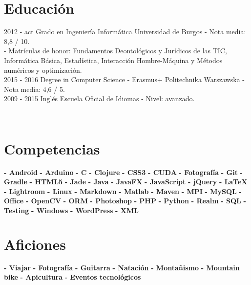 \documentclass[]{friggeri-cv}
\begin{document}
\section{Educación}
\begin{entrylist}
  \entry
    {2012 - act}
    {Grado en Ingeniería Informática}
    {Universidad de Burgos}
    {- Nota media: 8,8 / 10.\\
    - Matrículas de honor: Fundamentos Deontológicos y Jurídicos de las TIC, Informática Básica, Estadística, Interacción Hombre-Máquina y Métodos numéricos y optimización.\\}
  \entry
    {2015 - 2016}
    {Degree in Computer Science - Erasmus+}
    {Politechnika Warszawska}
    {- Nota media: 4,6 / 5.\\}
  \entry
    {2009 - 2015}
    {Inglés}
    {Escuela Oficial de Idiomas}
    {- Nivel: avanzado.\\}
\end{entrylist}

\newpage

\begin{aside}
~
~
~
  \section{\vspace{0.49cm}Competencias}
    \textbf{- Android}
    \textbf{- Arduino}
    \textbf{- C}
    \textbf{- Clojure}
    \textbf{- CSS3}
    \textbf{- CUDA}
    \textbf{- Fotografía}
    \textbf{- Git}
    \textbf{- Gradle}
    \textbf{- HTML5}
    \textbf{- Jade}
    \textbf{- Java}
    \textbf{- JavaFX}
    \textbf{- JavaScript}
    \textbf{- jQuery}
    \textbf{- \LaTeX}
    \textbf{- Lightroom}
    \textbf{- Linux}
    \textbf{- Markdown}
    \textbf{- Matlab}
    \textbf{- Maven}
    \textbf{- MPI}
    \textbf{- MySQL}
    \textbf{- Office}
    \textbf{- OpenCV}
    \textbf{- ORM}
    \textbf{- Photoshop}
    \textbf{- PHP}
    \textbf{- Python}
    \textbf{- Realm}
    \textbf{- SQL}
    \textbf{- Testing}
    \textbf{- Windows}
    \textbf{- WordPress}
    \textbf{- XML}
    ~
  \section{Aficiones}
    \textbf{- Viajar}
    \textbf{- Fotografía}
    \textbf{- Guitarra}
    \textbf{- Natación}
    \textbf{- Montañismo}
    \textbf{- Mountain bike}    
    \textbf{- Apicultura}
    \textbf{- Eventos tecnológicos}
    ~
\end{aside}
\end{document}
